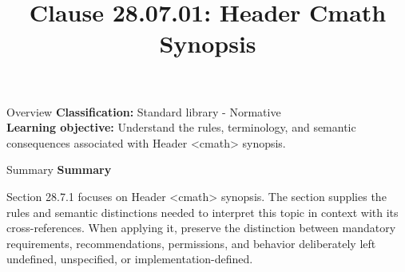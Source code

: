 \documentclass[10pt,letterpaper]{article}
\title{Clause 28.07.01: Header Cmath Synopsis}
\author{}
\date{}
\begin{document}
\maketitle
\begin{CornellOverviewBox}{Overview}
\textbf{Classification:} Standard library - Normative\\[2pt]
\textbf{Learning objective:} Understand the rules, terminology, and semantic consequences associated with Header <cmath> synopsis.
\end{CornellOverviewBox}\begin{CornellSummaryBox}{Summary}
{\sffamily\bfseries\color{Accent} Summary}\par\vspace{3pt}Section 28.7.1 focuses on Header <cmath> synopsis. The section supplies the rules and semantic distinctions needed to interpret this topic in context with its cross-references. When applying it, preserve the distinction between mandatory requirements, recommendations, permissions, and behavior deliberately left undefined, unspecified, or implementation-defined.
\end{CornellSummaryBox}
\end{document}
